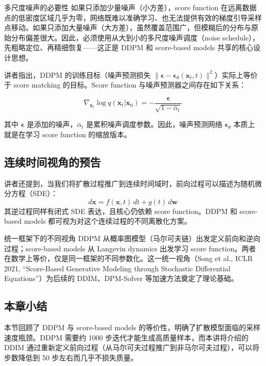 \documentclass[a4paper]{article}
\begin{document}
\begin{warningbox}{多尺度噪声的必要性}
如果只添加少量噪声（小方差），score function 在远离数据点的低密度区域几乎为零，网络既难以准确学习、也无法提供有效的梯度引导采样点移动。如果只添加大量噪声（大方差），虽然覆盖范围广，但模糊后的分布与原始分布偏差很大。因此，必须使用从大到小的多尺度噪声调度（noise schedule），先粗略定位、再精细恢复——这正是 DDPM 和 score-based models 共享的核心设计思想。
\end{warningbox}

讲者指出，DDPM 的训练目标（噪声预测损失 $\|\boldsymbol{\epsilon} - \boldsymbol{\epsilon}_\theta(\mathbf{x}_t, t)\|^2$）实际上等价于 score matching 的目标。Score function 与噪声预测器之间存在如下关系：

$$
\nabla_{\mathbf{x}_t} \log q(\mathbf{x}_t | \mathbf{x}_0) = -\frac{\boldsymbol{\epsilon}}{\sqrt{1 - \bar{\alpha}_t}}
$$

其中 $\boldsymbol{\epsilon}$ 是添加的噪声，$\bar{\alpha}_t$ 是累积噪声调度参数。因此，噪声预测网络 $\boldsymbol{\epsilon}_\theta$ 本质上就是在学习 score function 的缩放版本。

\subsection{连续时间视角的预告}

讲者还提到，当我们将扩散过程推广到连续时间域时，前向过程可以描述为随机微分方程（SDE）：
$$
d\mathbf{x} = f(\mathbf{x}, t)\,dt + g(t)\,d\mathbf{w}
$$
其逆过程同样有闭式 SDE 表达，且核心仍依赖 score function。DDPM 和 score-based models 都可视为对这个连续过程的不同离散化方案。

\begin{knowledgebox}{统一框架下的不同视角}
DDPM 从概率图模型（马尔可夫链）出发定义前向和逆向过程；score-based models 从 Langevin dynamics 出发学习 score function。两者在数学上等价，仅是同一框架的不同参数化。这一统一视角（Song et al., ICLR 2021, ``Score-Based Generative Modeling through Stochastic Differential Equations''）为后续的 DDIM、DPM-Solver 等加速方法奠定了理论基础。
\end{knowledgebox}

\subsection{本章小结}

本节回顾了 DDPM 与 score-based models 的等价性，明确了扩散模型面临的采样速度瓶颈。DDPM 需要约 1000 步迭代才能生成高质量样本，而本讲将介绍的 DDIM 通过重新定义前向过程（从马尔可夫过程推广到非马尔可夫过程），可以将步数降低到 50 步左右而几乎不损失质量。
\end{document}
